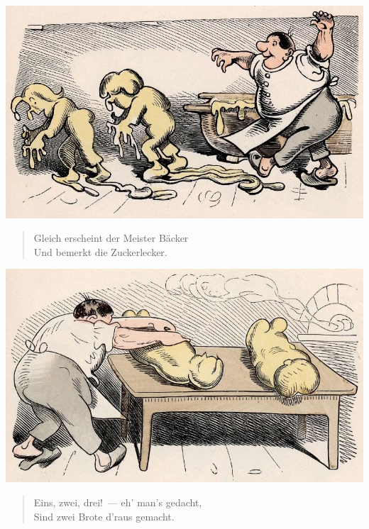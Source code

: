 \documentclass[a4paper,12pt]{article}
\begin{document}
\begin{center}\includegraphics[scale=.7, alt={... bemerkt sie Meister Bäcker}]{images/6-10.jpg}\end{center}



\begin{verse}
Gleich erscheint der Meister Bäcker\\{}
Und bemerkt die Zuckerlecker.
\end{verse}



\begin{center}\includegraphics[scale=.7, alt={Zwei Brote}]{images/6-11.jpg}\end{center}



\begin{verse}
Eins, zwei, drei!~— eh' man's gedacht,\\{}
Sind zwei Brote d'raus gemacht.
\end{verse}
\end{document}
